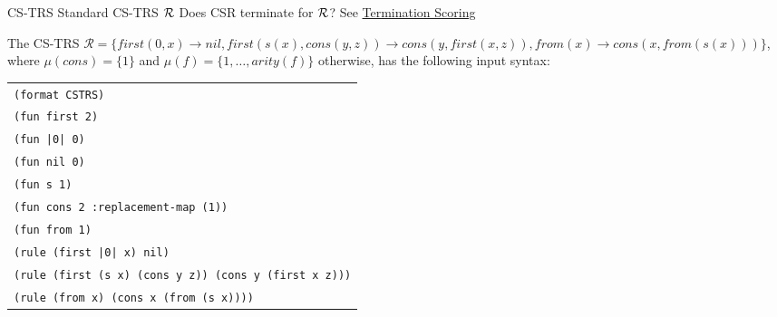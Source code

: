 \begin{formalproblem}
  {CS-TRS Standard}
  {CS-TRS $\mathcal{R}$}
  {Does CSR terminate for ${\cal R}$?}
  {See \hyperref[scoring_termination]{Termination Scoring}}
\end{formalproblem}

\begin{example}
The CS-TRS $\mathcal{R} = \{first(0,x) \rightarrow nil, first(s(x), cons(y,z)) \rightarrow cons(y, first(x,z)), from(x) \rightarrow cons(x, from(s(x)))\}$, where $\mu(cons) = \{1\}$ and $\mu(f) = \{1,\ldots,arity(f)\}$ otherwise, has the following input syntax:

\begin{center}
\begin{tabular}{l}
\texttt{(format CSTRS)} \\
\texttt{(fun first 2)} \\
\texttt{(fun |0| 0)} \\
\texttt{(fun nil 0)} \\
\texttt{(fun s 1)} \\
\texttt{(fun cons 2 :replacement-map (1))} \\
\texttt{(fun from 1)} \\
\texttt{(rule (first |0| x) nil)} \\
\texttt{(rule (first (s x) (cons y z)) (cons y (first x z)))} \\
\texttt{(rule (from x) (cons x (from (s x))))}
\end{tabular}
\end{center}
\end{example}
